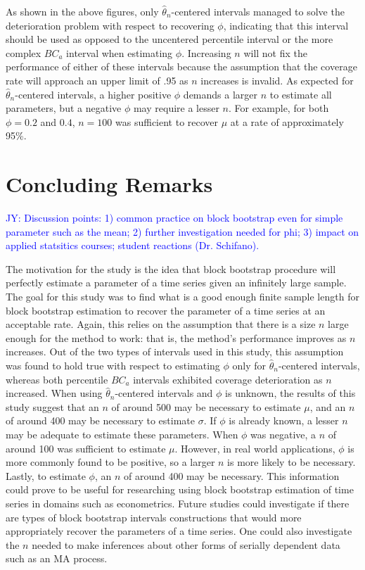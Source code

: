 \documentclass[12pt, letterpaper, titlepage]{article}
\newcommand{\jy}[1]{\textcolor{blue}{JY: #1}}
\begin{document}
As shown in the above figures, only $\hat{\theta}_{n}$-centered intervals
managed to solve the deterioration problem with respect to recovering $\phi$,
indicating that this interval should be used as opposed to the uncentered
percentile interval or the more complex $BC_a$ interval when estimating
$\phi$. Increasing $n$ will not fix the performance of either of these
intervals because the assumption that the coverage rate will approach an upper
limit of .95 as $n$ increases is invalid. As expected for
$\hat{\theta}_{n}$-centered intervals, a higher positive $\phi$ demands a
larger $n$ to estimate all parameters, but a negative $\phi$ may require a
lesser $n$. For example, for both $\phi = 0.2$ and $0.4$, $n = 100$ was
sufficient to recover $\mu$ at a rate of approximately 95\%.


\section{Concluding Remarks}
\label{sec:conremarks}

\jy{Discussion points:
  1) common practice on block bootstrap even for simple parameter such as the
  mean;
  2) further investigation needed for phi;
  3) impact on applied statsitics courses; student reactions (Dr. Schifano).
}


The motivation for the study is the idea that block bootstrap procedure will
perfectly estimate a parameter of a time series given an infinitely large
sample. The goal for this study was to find what is a good enough finite
sample length for block bootstrap estimation to recover the parameter of a
time series at an acceptable rate. Again, this relies on the assumption that
there is a size $n$ large enough for the method to work: that is, the method's
performance improves as $n$ increases. Out of the two types of intervals used
in this study, this assumption was found to hold true with respect to
estimating $\phi$ only for $\hat{\theta}_{n}$-centered intervals, whereas both
percentile $BC_a$ intervals exhibited coverage deterioration as $n$
increased. When using $\hat{\theta}_{n}$-centered intervals and $\phi$ is
unknown, the results of this study suggest that an $n$ of around 500 may be
necessary to estimate $\mu$, and an $n$ of around 400 may be necessary to
estimate $\sigma$. If $\phi$ is already known, a lesser $n$ may be adequate to
estimate these parameters. When $\phi$ was negative, a $n$ of around 100 was
sufficient to estimate $\mu$. However, in real world applications, $\phi$ is
more commonly found to be positive, so a larger $n$ is more likely to be
necessary. Lastly, to estimate $\phi$, an $n$ of around 400 may be necessary.
This information could prove to be useful for researching using block bootstrap
estimation of time series in domains such as econometrics. Future studies
could investigate if there are types of block bootstrap intervals
constructions that would more appropriately recover the parameters of a time
series. One could also investigate the $n$ needed to make inferences about
other forms of serially dependent data such as an MA process.




\end{document}

